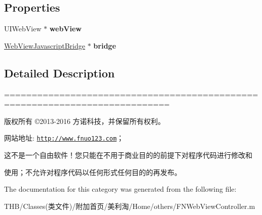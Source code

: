 \subsection*{Properties}
\begin{DoxyCompactItemize}
\item 
\mbox{\label{category_f_n_web_view_controller_07_08_ad92010b02fb181f5b80687691bb8824f}} 
U\+I\+Web\+View $\ast$ {\bfseries web\+View}
\item 
\mbox{\label{category_f_n_web_view_controller_07_08_a710a1ddcb45dc5b91e8a915b4c73840d}} 
\mbox{\hyperlink{interface_web_view_javascript_bridge}{Web\+View\+Javascript\+Bridge}} $\ast$ {\bfseries bridge}
\end{DoxyCompactItemize}


\subsection{Detailed Description}
============================================================================

版权所有 ©2013-\/2016 方诺科技，并保留所有权利。

网站地址\+: \href{http://www.fnuo123.com}{\tt http\+://www.\+fnuo123.\+com}； 



这不是一个自由软件！您只能在不用于商业目的的前提下对程序代码进行修改和

使用；不允许对程序代码以任何形式任何目的的再发布。 

 

The documentation for this category was generated from the following file\+:\begin{DoxyCompactItemize}
\item 
T\+H\+B/\+Classes(类文件)/附加首页/美利淘/\+Home/others/F\+N\+Web\+View\+Controller.\+m\end{DoxyCompactItemize}
